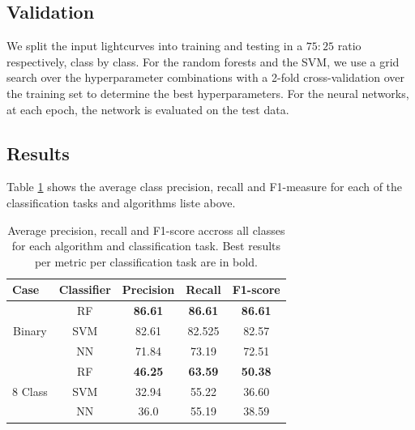 \documentclass[twocolumn]{aastex62}
\begin{document}
\subsection{Validation} \label{subsection_importances}

We split the input lightcurves into training and testing in a $75:25$
ratio respectively, class by class. 
For the random forests and the SVM, we use a grid search over the
hyperparameter combinations with a 2-fold cross-validation over the
training set to determine the best hyperparameters.  
For the neural networks, at each epoch, the network is evaluated on
the test data.  


\subsection{Results}

Table \ref{table:all-avg-results} shows the average class precision,
recall and F1-measure for each of the classification tasks and
algorithms liste above.  


\begin{table}
\centering
\begin{tabular}{ccccc}
\hline
\multicolumn{1}{l}{\textbf{Case}} & \textbf{Classifier} & \textbf{Precision} & \textbf{Recall} & \textbf{F1-score} \\ \hline \hline
\multirow{3}{*}{Binary}                 & RF                  & \textbf{86.61}    & \textbf{86.61} & \textbf{86.61}   \\
                                        & SVM                 & 82.61             & 82.525          & 82.57             \\
                                        & NN                  & 71.84              & 73.19           & 72.51             \\ \hline
\multirow{3}{*}{8 Class}                & RF                  & \textbf{46.25}     & \textbf{63.59}  & \textbf{50.38}             \\
                                        & SVM                 & 32.94              & 55.22           & 36.60             \\
                                        & NN                  & 36.0     & 55.19           & 38.59   \\ \hline
\end{tabular}%
\caption{Average precision, recall and F1-score accross all classes
  for each algorithm and classification task. Best results per metric
  per classification task are in bold.} 
\label{table:all-avg-results}
\end{table}
\end{document}
